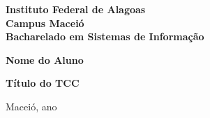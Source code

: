 %
%

\begin{titlepage}

\begin{center}

\large
\textbf{Instituto Federal de Alagoas\\
 Campus Maceió\\
 Bacharelado em Sistemas de Informação}
\end{center}

\begin{center}
\vfill
\vfill
\vfill
\Large

\textbf{Nome do Aluno} \\


\vfill

\LARGE

\textbf{Título do TCC}

\vfill


\vfill

\vfill

\vfill

\vfill

\vfill

\vfill

\vfill

\vfill

\large

%
%
%

Maceió, ano

\end{center}

\end{titlepage}
